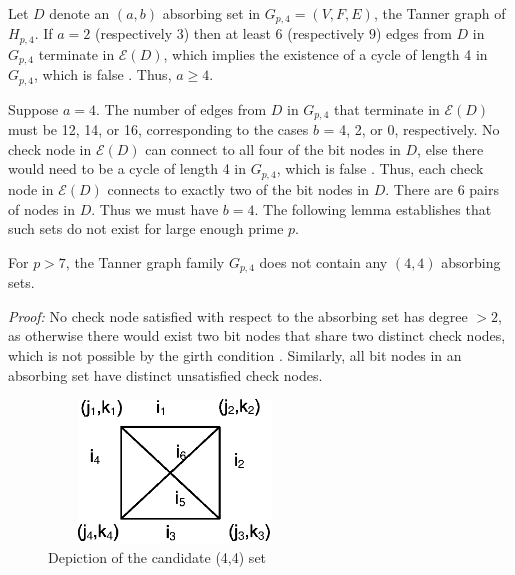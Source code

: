 Let $D$ denote an $(a,b)$ absorbing set in $G_{p,4}=(V,F,E)$, the
Tanner graph of $H_{p,4}$. If $a=2$ (respectively $3$) then at
least $6$ (respectively $9$) edges from $D$ in $G_{p,4}$ terminate
in $\mathcal{E}(D)$, which implies the existence of a cycle of
length 4 in $G_{p,4}$, which is false \cite{fan}. Thus, $a \geq
4$.

Suppose $a=4$. The number of edges from $D$ in $G_{p,4}$ that
terminate in $\mathcal{E}(D)$ must be 12, 14, or 16, corresponding
to the cases $b$ = 4, 2, or 0, respectively. No check node in
$\mathcal{E}(D)$ can connect to all four of the bit nodes in $D$,
else there would need to be a cycle of length 4 in $G_{p,4}$,
which is false \cite{fan}. Thus, each check node in
$\mathcal{E}(D)$ connects to exactly two of the bit nodes in $D$.
There are $6$ pairs of nodes in $D$. Thus we must have $b=4$. The
following lemma establishes that such sets do not exist for large
enough prime $p$.


\begin{lemma}\label{Lem2} For $p>7$, the Tanner graph family $G_{p,4}$
does not contain any $(4,4)$ absorbing sets.
\end{lemma}
\noindent \textit{Proof:} No check node satisfied with respect to
the absorbing set has degree $> 2$, as otherwise there would exist
two bit nodes that share two distinct check nodes, which is not
possible by the girth condition \cite{fan}. Similarly, all bit
nodes in an absorbing set have distinct unsatisfied check nodes.

\begin{figure}
\center\includegraphics[width=2.65in,height=1.5in]{Drawing10_1.eps}
\caption{Depiction of the candidate (4,4) set} \label{fig44}
\end{figure}

